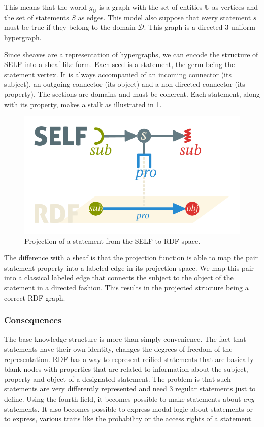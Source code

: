 \documentclass[11pt,a4paper,twoside,openright,titlepage,numbers=noenddot,headinclude,cleardoublepage=empty,openany]{scrreprt}
\theoremstyle{plain}
\theoremstyle{definition}
\theoremstyle{remark}
\newcommand{\bb}{\mathbb}
\renewcommand{\cal}{\mathcal}
\begin{document}
This means that the world \(g_{\bb{U}}\) is a graph with the set of
entities \(\bb{U}\) as vertices and the set of statements \(S\) as
edges. This model also suppose that every statement \(s\) must be true
if they belong to the domain \(\cal{D}\). This graph is a directed
3-uniform hypergraph.

Since sheaves are a representation of hypergraphs, we can encode the
structure of SELF into a sheaf-like form. Each seed is a statement, the
germ being the statement vertex. It is always accompanied of an incoming
connector (its subject), an outgoing connector (its object) and a
non-directed connector (its property). The sections are domains and must
be coherent. Each statement, along with its property, makes a stalk as
illustrated in \cref{fig:selfgraph}.

\begin{figure}
\hypertarget{fig:selfgraph}{%
\centering
\includegraphics{./tex2pdf.-0b80fea6fd6da7f9/d70a8f74d53e09b2cf38ebe88374098e019f7b83.pdf}
\caption{Projection of a statement from the SELF to RDF
space.}\label{fig:selfgraph}
}
\end{figure}

The difference with a sheaf is that the projection function is able to
map the pair statement-property into a labeled edge in its projection
space. We map this pair into a classical labeled edge that connects the
subject to the object of the statement in a directed fashion. This
results in the projected structure being a correct RDF graph.

\hypertarget{consequences}{%
\subsubsection{Consequences}\label{consequences}}

The base knowledge structure is more than simply convenience. The fact
that statements have their own identity, changes the degrees of freedom
of the representation. RDF has a way to represent reified statements
that are basically blank nodes with properties that are related to
information about the subject, property and object of a designated
statement. The problem is that such statements are very differently
represented and need 3 regular statements just to define. Using the
fourth field, it becomes possible to make statements about \emph{any}
statements. It also becomes possible to express modal logic about
statements or to express, various traits like the probability or the
access rights of a statement.
\end{document}
